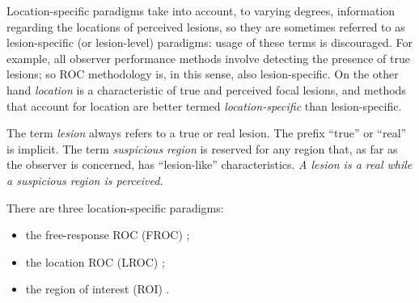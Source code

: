 \documentclass[
]{book}
\providecommand{\tightlist}{%
  \setlength{\itemsep}{0pt}\setlength{\parskip}{0pt}}
\begin{document}
Location-specific paradigms take into account, to varying degrees, information regarding the locations of perceived lesions, so they are sometimes referred to as lesion-specific (or lesion-level) paradigms: usage of these terms is discouraged. For example, all observer performance methods involve detecting the presence of true lesions; so ROC methodology is, in this sense, also lesion-specific. On the other hand \emph{location} is a characteristic of true and perceived focal lesions, and methods that account for location are better termed \emph{location-specific} than lesion-specific.

The term \emph{lesion} always refers to a true or real lesion. The prefix ``true'' or ``real'' is implicit. The term \emph{suspicious region} is reserved for any region that, as far as the observer is concerned, has ``lesion-like'' characteristics. \emph{A lesion is a real while a suspicious region is perceived.}

There are three location-specific paradigms:

\begin{itemize}
\tightlist
\item
  the free-response ROC (FROC) \citep{bunch1977free, chakraborty1989maximum};
\item
  the location ROC (LROC) \citep{starr1977comments, swensson1996unified};
\item
  the region of interest (ROI) \citep{obuchowski2010data}.
\end{itemize}
\end{document}
